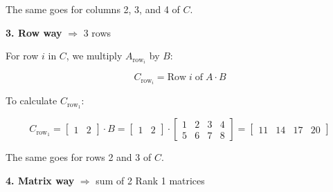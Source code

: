 \noindent The same goes for columns 2, 3, and 4 of $C$.

\noindent\textbf{3. Row way} $\Rightarrow$ 3 rows

\noindent For row $i$ in $C$, we multiply $A_{\text{row}_i}$ by $B$:

\[
	C_{\text{row}_i} = \text{Row} \; i \; \text{of} \; A \cdot B
\]

\noindent To calculate $C_{\text{row}_1}$:

\[
	C_{\text{row}_1} = \begin{bmatrix}
		1 & 2
	\end{bmatrix} \cdot B
	=
	\begin{bmatrix}
		1 & 2
	\end{bmatrix} \cdot
	\begin{bmatrix}
		1 & 2 & 3 & 4 \\
		5 & 6 & 7 & 8
	\end{bmatrix}
	=
	\begin{bmatrix}
		11 & 14 & 17 & 20
	\end{bmatrix}
\]

\noindent The same goes for rows 2 and 3 of $C$.

\noindent\textbf{4. Matrix way} $\Rightarrow$ sum of 2 Rank 1 matrices

